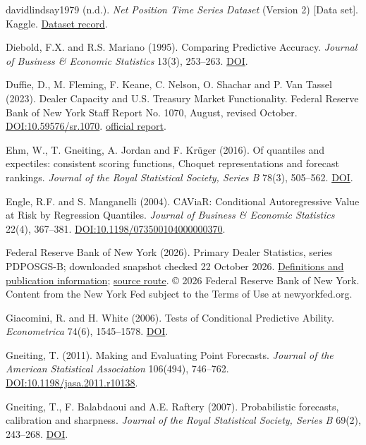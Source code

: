 \documentclass[10pt,a4paper]{article}
\begin{document}
davidlindsay1979 (n.d.). \emph{Net Position Time Series Dataset} (Version 2) [Data set]. Kaggle. \href{https://www.kaggle.com/datasets/davidlindsay1979/net-position-time-series-dataset}{Dataset record}.

Diebold, F.X. and R.S. Mariano (1995). Comparing Predictive Accuracy. \emph{Journal of Business \& Economic Statistics} 13(3), 253--263. \href{https://doi.org/10.1080/07350015.1995.10524599}{DOI}.

Duffie, D., M. Fleming, F. Keane, C. Nelson, O. Shachar and P. Van Tassel (2023). Dealer Capacity and U.S. Treasury Market Functionality. Federal Reserve Bank of New York Staff Report No. 1070, August, revised October. \href{https://doi.org/10.59576/sr.1070}{DOI:10.59576/sr.1070}. \href{https://www.newyorkfed.org/medialibrary/media/research/staff_reports/sr1070.pdf}{official report}.

Ehm, W., T. Gneiting, A. Jordan and F. Krüger (2016). Of quantiles and expectiles: consistent scoring functions, Choquet representations and forecast rankings. \emph{Journal of the Royal Statistical Society, Series B} 78(3), 505--562. \href{https://doi.org/10.1111/rssb.12154}{DOI}.

Engle, R.F. and S. Manganelli (2004). CAViaR: Conditional Autoregressive Value at Risk by Regression Quantiles. \emph{Journal of Business \& Economic Statistics} 22(4), 367--381. \href{https://doi.org/10.1198/073500104000000370}{DOI:10.1198/073500104000000370}.

Federal Reserve Bank of New York (2026). Primary Dealer Statistics, series PDPOSGS-B; downloaded snapshot checked 22 October 2026. \href{https://www.newyorkfed.org/markets/counterparties/primary-dealers-statistics}{Definitions and publication information}; \href{https://markets.newyorkfed.org/api/pd/get/PDPOSGS-B.csv}{source route}. \copyright{} 2026 Federal Reserve Bank of New York. Content from the New York Fed subject to the Terms of Use at newyorkfed.org.

Giacomini, R. and H. White (2006). Tests of Conditional Predictive Ability. \emph{Econometrica} 74(6), 1545--1578. \href{https://doi.org/10.1111/j.1468-0262.2006.00718.x}{DOI}.

Gneiting, T. (2011). Making and Evaluating Point Forecasts. \emph{Journal of the American Statistical Association} 106(494), 746--762. \href{https://doi.org/10.1198/jasa.2011.r10138}{DOI:10.1198/jasa.2011.r10138}.

Gneiting, T., F. Balabdaoui and A.E. Raftery (2007). Probabilistic forecasts, calibration and sharpness. \emph{Journal of the Royal Statistical Society, Series B} 69(2), 243--268. \href{https://doi.org/10.1111/j.1467-9868.2007.00587.x}{DOI}.
\end{document}
